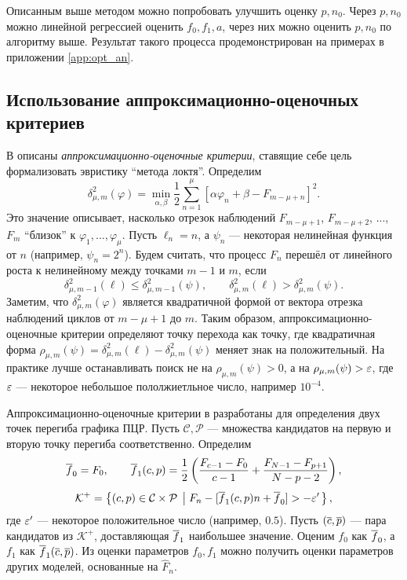 Описанным выше методом можно попробовать улучшить оценку $p,n_0$. Через $p,n_0$
можно линейной регрессией оценить $f_0,f_1,a$, через них можно оценить $p,n_0$
по алгоритму выше. Результат такого процесса продемонстрирован на примерах в
приложении \ref{app:opt_an}.

\subsection{Использование аппроксимационно-оценочных критериев}\label{ssec:app-est}

В
\cite{orekhovQuasiDeterministicProcessesMonotonic2021,orekhovUnsupervisedMachineLearning2023}
описаны {\it аппроксимационно-оценочные критерии}, ставящие себе цель
формализовать эвристику \enquote{метода локтя}. Определим
\[
  \delta_{\mu,m}^{2}(\varphi) = \min_{\alpha,\beta}\frac{1}{2}
  \sum_{n=1}^{\mu}[\alpha\varphi_{n}+\beta - F_{m-\mu+n}]^{2}.
\]
Это значение описывает, насколько отрезок наблюдений $F_{m-\mu+1}$,
$F_{m-\mu+2}$, ..., $F_{m}$  \enquote{близок} к $\varphi_1,...,\varphi_{\mu}$.
Пусть $\ell_{n}=n$, а $\psi_{n}$ --- некоторая нелинейная функция от $n$
(например, $\psi_{n}=2^{n}$). Будем считать, что процесс $F_{n}$ перешёл от
линейного роста к нелинейному между точками $m-1$ и $m$, если
\[
  \delta^{2}_{\mu,m-1}(\ell)\leq\delta^{2}_{\mu,m-1}(\psi),\qquad
  \delta^{2}_{\mu,m}(\ell)>\delta^{2}_{\mu,m}(\psi).
\]
Заметим, что $\delta^{2}_{\mu,m}(\varphi)$ является квадратичной формой от
вектора отрезка наблюдений циклов от $m-\mu+1$ до $m$. Таким образом,
аппроксимационно\hyp{}оценочные критерии определяют точку перехода как точку,
где квадратичная форма
$\rho_{\mu,m}(\psi)=\delta^{2}_{\mu,m}(\ell)-\delta^{2}_{\mu,m}(\psi)$
меняет знак на положительный. На практике лучше останавливать поиск не на
$\rho_{\mu,m}(\psi)>0$, а на $\rho_{\mu,m}(\psi)>\varepsilon$, где $\varepsilon$ ---
некоторое небольшое пололжиетльное число, например $10^{-4}$.

Аппроксимационно\hyp{}оценочные критерии в
\cite{orekhovUnsupervisedMachineLearning2023} разработаны для определения двух
точек перегиба графика ПЦР. Пусть $\mathcal C,\mathcal P$ --- множества
кандидатов на первую и вторую точку перегиба соответственно. Определим
\[
  \overline{f}_0= F_0,\qquad
  \overline{f}_1(c,p)=\frac{1}{2}\left(\frac{F_{c-1}-F_0}{c-1}
  +\frac{F_{N-1}-F_{p+1}}{N-p-2}\right),
\]
\[
  \mathcal K^{+}=\left\{(c,p)\in\mathcal C\times\mathcal P\;\left|\;
  F_{n}- [\overline{f}_1(c,p)n+\overline{f}_0]>-\varepsilon'\right.
  \right\},
\]
где $\varepsilon'$ --- некоторое положительное число (например, $0.5$). Пусть
$(\overline{c}, \overline{p})$ --- пара кандидатов из $\mathcal K^{+}$, доставляющая
$\overline{f}_1$ наибольшее значение. Оценим $f_0$ как $\overline{f}_0$, а $f_1$ как
$\overline{f}_1(\overline{c},\overline{p})$. Из оценки параметров $f_0,f_1$ можно получить
оценки параметров других моделей, основанные на $\hat F_{n}$.

